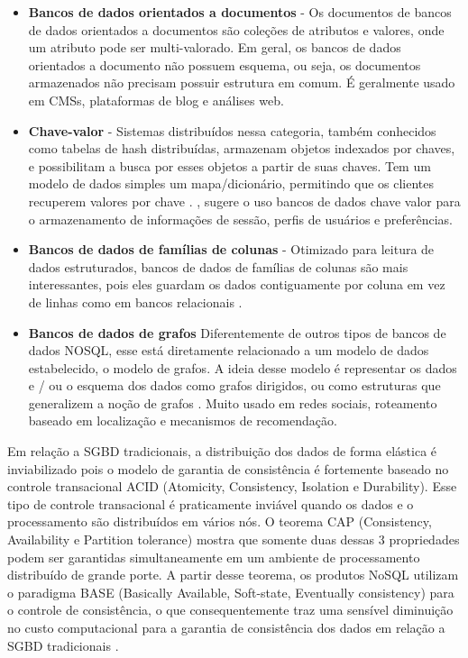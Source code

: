 \documentclass[a4paper,12pt]{monografia}
\begin{document}
\begin{itemize}
	\item  \textbf{Bancos de dados orientados a documentos} - Os documentos de bancos de dados orientados a documentos são coleções de atributos e valores, onde um atributo pode ser multi-valorado. Em geral, os bancos de dados orientados a documento não possuem esquema, ou seja, os documentos armazenados não precisam possuir estrutura em comum. É geralmente usado em CMSs, plataformas de blog e análises web.

	\item \textbf{Chave-valor} - Sistemas distribuídos nessa categoria, também conhecidos como tabelas de hash distribuídas, armazenam objetos indexados por chaves, e possibilitam a busca por esses objetos a partir de suas chaves. Tem um modelo de dados simples um mapa/dicionário, permitindo que os clientes recuperem valores por chave \cite{strauch2011nosql}. , sugere o uso bancos de dados chave valor para o armazenamento de informações de sessão, perfis de usuários e preferências.

	\item \textbf{Bancos de dados de famílias de colunas} - Otimizado para leitura de dados estruturados, bancos de dados de famílias de colunas são mais interessantes, pois eles guardam os dados contiguamente por coluna em vez de linhas como em bancos relacionais \cite{stonebraker2005c}.

	\item \textbf{Bancos de dados de grafos} Diferentemente de outros tipos de bancos de dados NOSQL, esse está diretamente relacionado a um modelo de dados estabelecido, o modelo de grafos. A ideia desse modelo é representar os dados e / ou o esquema dos dados como grafos dirigidos, ou como estruturas que generalizem a noção de grafos \cite{angles2008survey}. Muito usado em redes sociais, roteamento baseado em localização e mecanismos de recomendação.

\end{itemize}

Em relação a SGBD tradicionais, a distribuição dos dados de forma elástica é inviabilizado pois o modelo de garantia de consistência é fortemente baseado no controle transacional ACID (Atomicity, Consistency, Isolation e Durability). Esse tipo de controle transacional é praticamente inviável quando os dados e o processamento são distribuídos em vários nós. O teorema CAP (Consistency, Availability e Partition tolerance) mostra que somente duas dessas 3 propriedades podem ser garantidas simultaneamente em um ambiente de processamento distribuído de grande porte. A partir desse teorema, os produtos NoSQL utilizam o paradigma BASE (Basically Available, Soft-state, Eventually consistency) para o controle de consistência, o que consequentemente traz uma sensível diminuição no custo computacional para a garantia de consistência dos dados em relação a SGBD tradicionais \cite{vieira2012bancos}.
\end{document}

